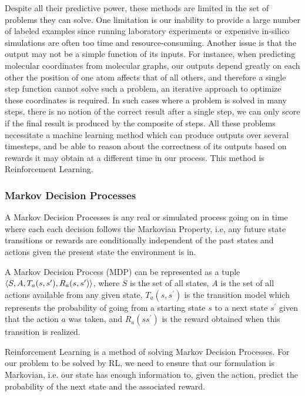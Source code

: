 Despite all their predictive power, these methods are limited in the set of problems they can solve. One limitation is our inability to provide a large number of labeled examples since running laboratory experiments or expensive in-silico simulations are often too time and resource-consuming. Another issue is that the output may not be a simple function of its inputs. For instance, when predicting molecular coordinates from molecular graphs, our outputs depend greatly on each other the position of one atom affects that of all others, and therefore a single step function cannot solve such a problem, an iterative approach to optimize these coordinates is required. In such cases where a problem is solved in many steps, there is no notion of the correct result after a single step, we can only score if the final result is produced by the composite of steps. All these problems necessitate a machine learning method which can produce outputs over several timesteps, and be able to reason about the correctness of its outputs based on rewards it may obtain at a different time in our process. This method is Reinforcement Learning. \cite{rl-intro-sutton-barto}


\subsubsection{Markov Decision Processes}


A Markov Decision Processes is any real or simulated process going on in time where each each decision follows the Markovian Property, i.e, any future state transitions or rewards are conditionally independent of the past states and actions given the present state the environment is in.

A Markov Decision Process (MDP) can be represented as a tuple $\braket{S, A, T_a(s, s^\prime), R_a(s, s^\prime)}$, where $S$ is the set of all states, $A$ is the set of all actions available from any given state, $T_a(s, s^\prime)$ is the transition model which represents the probability of going from a starting state $s$ to a next state $s^\prime$ given that the action $a$ was taken, and $R_a(s s^\prime)$ is the reward obtained when this transition is realized.

Reinforcement Learning is a method of solving Markov Decision Processes. For our problem to be solved by RL, we need to ensure that our formulation is Markovian, i.e. our state has enough information to, given the action, predict the probability of the next state and the associated reward.

